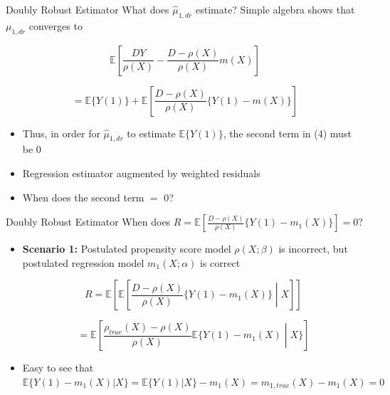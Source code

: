 \documentclass{beamer}
\begin{document}
\begin{frame}{Doubly Robust Estimator}
    What does \( \hat{\mu}_{1,dr} \) estimate? Simple algebra shows that \( \mu_{1, dr} \) converges to

    \[
    \mathbb{E}\left[ \frac{DY}{\rho(X)} - \frac{D - \rho(X)}{\rho(X)}m(X) \right]
    \]

    \[
    = \mathbb{E}\{Y(1)\} + \mathbb{E}\left[ \frac{D - \rho(X)}{\rho(X)}\{Y(1) - m(X)\} \right]
    \]


\begin{itemize}
\item     Thus, in order for \( \hat{\mu}_{1,dr} \) to estimate \( \mathbb{E}\{Y(1)\} \), the second term in (4) must be 0

\item     Regression estimator augmented by weighted residuals

\item     When does the second term $=$ 0?

\end{itemize}
\end{frame}

\begin{frame}{Doubly Robust Estimator}
    When does \( R = \mathbb{E} \left[ \frac{D - \rho(X)}{\rho(X)} \{Y(1) - m_1(X)\} \right] = 0? \)

    \begin{itemize}
        \item \textbf{Scenario 1:} Postulated propensity score model \( \rho(X; \beta) \) is
        incorrect, but postulated regression model \( m_1(X; \alpha) \) is correct

        \[
        R = \mathbb{E} \left[ \mathbb{E} \left[ \frac{D - \rho(X)}{\rho(X)} \{Y(1) - m_1(X)\} \middle| X \right] \right]
        \]

        \[
        = \mathbb{E} \left[ \frac{\rho_{true}(X) - \rho(X)}{\rho(X)} \mathbb{E} \{Y(1) - m_1(X) \middle| X\} \right]
        \]

\item Easy to see that \( \mathbb{E} \{Y(1) - m_1(X) | X\} = \mathbb{E} \{Y(1) | X\} - m_1(X) = m_{1,true}(X) - m_1(X) = 0 \)

    \end{itemize}
\end{frame}
\end{document}
